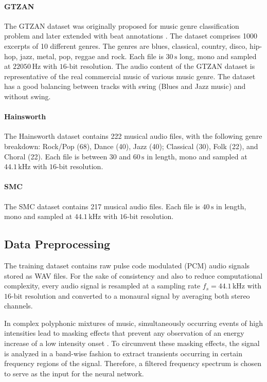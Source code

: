 \documentclass{scrartcl}
\begin{document}
\paragraph{GTZAN} 
The GTZAN \cite{Tzanetakis2002b} dataset was originally proposed for music genre classification problem and later extended with beat annotations \cite{marchand2015swing}. The dataset comprises 1000 excerpts of 10 different genres. The genres are blues, classical, country, disco, hip-hop, jazz, metal, pop, reggae and rock. Each file is $30\,\text{s}$ long, mono and sampled at $22050\,\text{Hz}$ with $16\text{-bit}$ resolution. The audio content of the GTZAN dataset is representative of the real commercial music of various music genre. The dataset has a good balancing between tracks with swing (Blues and Jazz music) and without swing.

\paragraph{Hainsworth} 
The Hainsworth dataset \cite{Hainsworth2004} contains 222 musical audio files, with the following genre breakdown: Rock/Pop (68), Dance (40), Jazz (40); Classical (30), Folk (22), and Choral (22). Each file is between $30$ and $60\,\text{s}$ in length, mono and sampled at $44.1\,\text{kHz}$ with $16\text{-bit}$ resolution.

\paragraph{SMC}
The SMC dataset \cite{Holzapfel2012} contains 217 musical audio files. Each file is $40 \,\text{s}$ in length, mono and sampled at $44.1\,\text{kHz}$ with $16\text{-bit}$ resolution.


\subsection{Data Preprocessing}

The training dataset contains raw pulse code modulated (PCM) audio signals stored as WAV files. For the sake of consistency and also to reduce computational complexity, every audio signal is resampled at a sampling rate $f_s = 44.1 \,\text{kHz}$ with $16\text{-bit}$ resolution and converted to a monaural signal by averaging both stereo channels. 

In complex polyphonic mixtures of music, simultaneously occurring events of high intensities lead to masking effects that prevent any observation of an energy increase of a low intensity onset \cite{Grosche2010}. To circumvent these masking effects, the signal is analyzed in a band-wise fashion to extract transients occurring in certain frequency regions of the signal. Therefore, a filtered frequency spectrum is chosen to serve as the input for the neural network.
\end{document}
